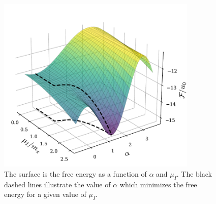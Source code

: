 \begin{figure}[htb]
    \centering
    \includegraphics[width=0.85\textwidth]{../scripts/figurer/free_energy_surface.pdf}
    \caption{
        The surface is the free energy as a function of $\alpha$ and $\mu_I$.
        The black dashed lines illustrate the value of $\alpha$ which minimizes the free energy for a given value of $\mu_I$.
    }
    \label{fig: free energy surface}
\end{figure}



